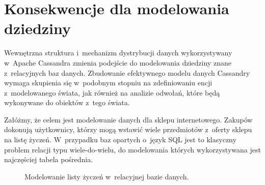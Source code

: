 \section{Konsekwencje dla modelowania dziedziny}

Wewnętrzna struktura i~mechanizm dystrybucji danych wykorzystywany w~Apache Cassandra zmienia podejście do modelowania dziedziny znane z~relacyjnych baz danych. Zbudowanie efektywnego modelu danych Cassandry wymaga skupienia się w~podobnym stopniu na zdefiniowaniu encji z~modelowanego świata, jak również na analizie odwołań, które będą wykonywane do obiektów z~tego świata.~\cite{modeling_best_practices_pt_1}

Załóżmy, że celem jest modelowanie danych dla sklepu internetowego. Zakupów dokonują użytkownicy, którzy mogą wstawić wiele przedmiotów z~oferty sklepu na listę życzeń. W~przypadku baz opartych o~język SQL jest to klasyczny problem relacji typu wiele-do-wielu, do modelowania których wykorzystywana jest najczęściej tabela pośrednia. 

\begin{figure}[ht!]
	\centering

	\caption{Modelowanie listy życzeń w~relacyjnej bazie danych.}
	\label{fig:er_wishlist}
\end{figure}

